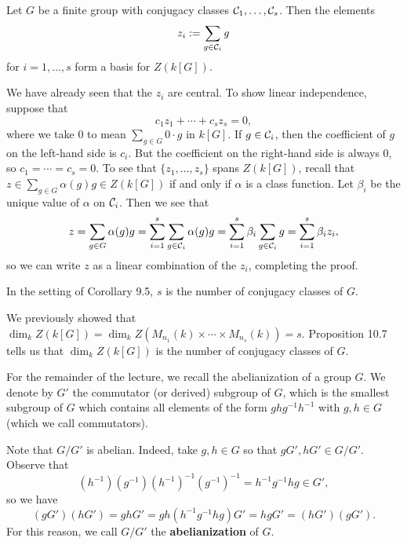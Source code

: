 \begin{prop}
    Let $G$ be a finite group with conjugacy classes ${\cal C}_1, 
    \dots, {\cal C}_s$. Then the elements 
    \[ z_i := \sum_{g \in {\cal C}_i} g \] 
    for $i = 1, \dots, s$ form a basis for $Z(k[G])$. 
\end{prop} 
\begin{pf}
    We have already seen that the $z_i$ are central. To show 
    linear independence, suppose that 
    \[ c_1 z_1 + \cdots + c_s z_s = 0, \] 
    where we take $0$ to mean $\sum_{g \in G} 0 \cdot g$ in $k[G]$. 
    If $g \in {\cal C}_i$, then the coefficient of $g$ on the left-hand 
    side is $c_i$. But the coefficient on the right-hand side is 
    always $0$, so $c_1 = \cdots = c_s = 0$. To see that 
    $\{z_1, \dots, z_s\}$ spans $Z(k[G])$, recall that 
    $z \in \sum_{g \in G} \alpha(g)g \in Z(k[G])$ if and only if 
    $\alpha$ is a class function. Let $\beta_i$ be the unique value 
    of $\alpha$ on ${\cal C}_i$. Then we see that 
    \[ z = \sum_{g \in G} \alpha(g)g = \sum_{i=1}^s \sum_{g \in {\cal C}_i} 
    \alpha(g)g = \sum_{i=1}^s \beta_i \sum_{g \in {\cal C}_i} g 
    = \sum_{i=1}^s \beta_i z_i, \] 
    so we can write $z$ as a linear combination of the $z_i$, completing the 
    proof. 
\end{pf}

\begin{thm}
    In the setting of Corollary 9.5, $s$ is the number of conjugacy 
    classes of $G$. 
\end{thm} 
\begin{pf}
    We previously showed that $\dim_k Z(k[G]) = \dim_k Z(M_{n_1}(k) \times 
    \cdots \times M_{n_s}(k)) = s$. Proposition 10.7 tells us that 
    $\dim_k Z(k[G])$ is the number of conjugacy classes of $G$. 
\end{pf} 

For the remainder of the lecture, we recall the abelianization of a group $G$.
We denote by $G'$ the commutator (or derived) subgroup of $G$, which is the 
smallest subgroup of $G$ which contains all elements of the form 
$ghg^{-1}h^{-1}$ with $g, h \in G$ (which we call commutators). 

Note that $G/G'$ is abelian. Indeed, take $g, h \in G$ so that 
$gG', hG' \in G/G'$. Observe that 
\[ (h^{-1})(g^{-1})(h^{-1})^{-1}(g^{-1})^{-1} = 
    h^{-1}g^{-1}hg \in G', \] 
so we have 
\[ (gG')(hG') = ghG' = gh(h^{-1}g^{-1}hg)G' = hgG' = (hG')(gG'). \]
For this reason, we call $G/G'$ the {\bf abelianization} of $G$. 

